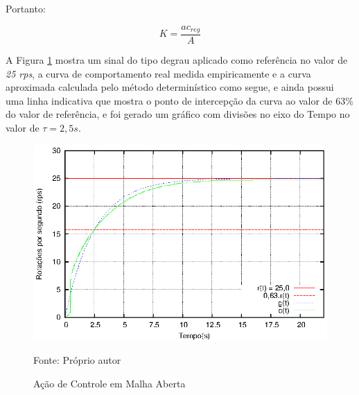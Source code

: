 Portanto:

\begin{equation}
K = \frac{ac_{reg}}{A}
\label{eq:calcK}
\end{equation}









A Figura \ref{fig:AnexoBacaoMalhaAberTau} mostra um sinal do tipo
degrau aplicado como referência no valor de \emph{25 rps}, a curva de
comportamento real medida empiricamente e a curva aproximada calculada
pelo método determinístico como segue, e ainda possui uma linha
indicativa que mostra o ponto de intercepção da curva ao valor de 63\%
do valor de referência, e foi gerado um gráfico com
divisões no eixo do Tempo no valor de $\tau = 2,5s $.

\begin{figure}[!htb]
\caption{Ação de Controle em Malha Aberta}
\center\includegraphics[scale=1.4]{./plot/acaoMalhaAbertaTau.eps}
\label{fig:AnexoBacaoMalhaAberTau}

{\small Fonte: Próprio autor}
\end{figure}


